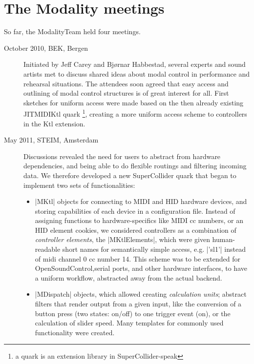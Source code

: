 \documentclass{article}
\newcommand{\todo}[1] {\emph{\textbf{TODO:} #1}}
\begin{document}
\section{The Modality meetings}
\label{sec:the_modality_meetings}

So far, the ModalityTeam held four meetings.

\begin{description}
	\item[October 2010, BEK, Bergen] Initiated by Jeff Carey and Bj\o{}rnar Habbestad, several experts and sound artists met to discuss shared ideas about modal control in performance and rehearsal situations.
	The attendees soon agreed that easy access and outlining of modal control structures is of great interest for all. First sketches for uniform access were made based on the then already existing JITMIDIKtl quark \footnote{a quark is an extension library in SuperCollider-speak}, creating a more uniform access scheme to controllers in the Ktl extension. 
	
	
	\item[May 2011, STEIM, Amsterdam] Discussions revealed the need for users to abstract from hardware dependencies, and being able to do flexible routings and filtering incoming data. We therefore developed a new SuperCollider quark that began to implement two sets of functionalities:
	
	\begin{itemize}
		\item 	|MKtl| objects for connecting to MIDI and HID hardware devices, and storing capabilities of each device in a configuration file.
		 Instead of assigning functions to hardware-specifics like MIDI cc numbers, or an HID element cookies, we considered controllers as a combination of \emph{controller elements}, the |MKtlElements|, which were given human-readable short names for semantically simple access, e.g. |'sl1'| instead of midi channel 0 cc number 14.
		 This scheme was to be extended for OpenSoundControl,serial ports, and other hardware interfaces, to have a uniform workflow, abstracted away from the actual backend.
		\item  |MDispatch| objects, which allowed creating \emph{calculation units}; abstract filters that render output from a given input, like the conversion of a button press (two states: on/off) to one trigger event (on), or the calculation of slider speed. Many templates for commonly used functionality were created.
	\end{itemize}
	

\end{description}
\end{document}
